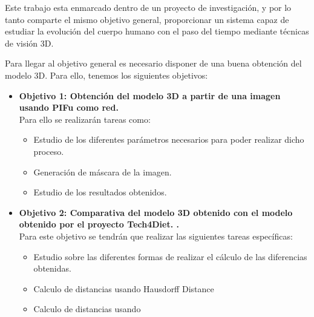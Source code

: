 
Este trabajo esta enmarcado dentro de un proyecto de investigación, y por lo tanto comparte el mismo objetivo general, proporcionar un sistema capaz de estudiar la evolución del cuerpo humano con el paso del tiempo mediante técnicas de visión 3D. 

Para llegar al objetivo general es necesario disponer de una buena obtención del modelo 3D. Para ello, tenemos los siguientes objetivos:


\begin{itemize}
	\item{\textbf{Objetivo 1: Obtención del modelo 3D a partir de una imagen usando PIFu como red.}} 
	\\Para ello se realizarán tareas como:
	\begin{itemize}
		\item Estudio de los diferentes parámetros necesarios para poder realizar dicho proceso.
		\item Generación de máscara de la imagen.
		\item Estudio de los resultados obtenidos.
		
		
	\end{itemize}
	\item{\textbf{Objetivo 2: Comparativa del modelo 3D obtenido con el modelo obtenido por el proyecto Tech4Diet. 
			.}} \\
	Para este objetivo se tendrán que realizar las siguientes tareas específicas:
	\begin{itemize}
		\item Estudio sobre las diferentes formas de realizar el cálculo de las diferencias obtenidas.
		\item Calculo de distancias usando Hausdorff Distance
		\item Calculo de distancias usando 
	\end{itemize}
\end{itemize}

\label{sec:Introducción}

